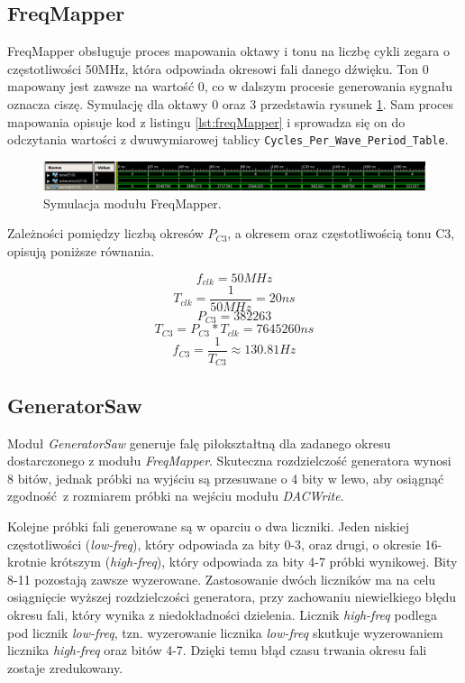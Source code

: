 \documentclass[12pt]{article}
\begin{document}
\subsection{FreqMapper}
FreqMapper obsługuje proces mapowania oktawy i tonu na liczbę cykli zegara o częstotliwości 50MHz, która odpowiada okresowi fali danego dźwięku. Ton 0 mapowany jest zawsze na wartość 0, co w dalszym procesie generowania sygnału oznacza ciszę. Symulację dla oktawy 0 oraz 3 przedstawia rysunek \ref{sim:mapper}. Sam proces mapowania opisuje kod z listingu \ref{lst:freqMapper} i sprowadza się on do odczytania wartości z dwuwymiarowej tablicy \lstinline{Cycles_Per_Wave_Period_Table}.
\begin{figure}[h]
  \centering
  \includegraphics[decodearray={1 0 1 0 1 0}, width=\linewidth]{images/mapper}
  \caption{Symulacja modułu FreqMapper.}
  \label{sim:mapper}
\end{figure}

Zależności pomiędzy liczbą okresów $P_{C3}$, a okresem oraz częstotliwością tonu C3, opisują poniższe równania.

\[ f_{clk} = 50MHz \]
\[ T_{clk} = \frac{1}{50MHz} = 20ns \]
\[ P_{C3} = 382263 \]
\[ T_{C3} = P_{C3} * T_{clk} = 7645260ns \]
\[ f_{C3} = \frac{1}{T_{C3}} \approx 130.81Hz \]




\subsection{GeneratorSaw}

Moduł \textit{GeneratorSaw} generuje falę piłokształtną dla zadanego okresu dostarczonego z modułu \textit{FreqMapper}. Skuteczna rozdzielczość generatora wynosi 8 bitów, jednak próbki na wyjściu są przesuwane o 4 bity w lewo, aby osiągnąć zgodność z rozmiarem próbki na wejściu modułu \textit{DACWrite}.

Kolejne próbki fali generowane są w oparciu o dwa liczniki. Jeden niskiej częstotliwości (\textit{low-freq}), który odpowiada za bity 0-3, oraz drugi, o okresie 16-krotnie krótszym (\textit{high-freq}), który odpowiada za bity 4-7 próbki wynikowej. Bity 8-11 pozostają zawsze wyzerowane. Zastosowanie dwóch liczników ma na celu osiągnięcie wyższej rozdzielczości generatora, przy zachowaniu niewielkiego błędu okresu fali, który wynika z niedokładności dzielenia. Licznik \textit{high-freq} podlega pod licznik \textit{low-freq}, tzn. wyzerowanie licznika \textit{low-freq} skutkuje wyzerowaniem licznika \textit{high-freq} oraz bitów 4-7. Dzięki temu błąd czasu trwania okresu fali zostaje zredukowany.
\end{document}
